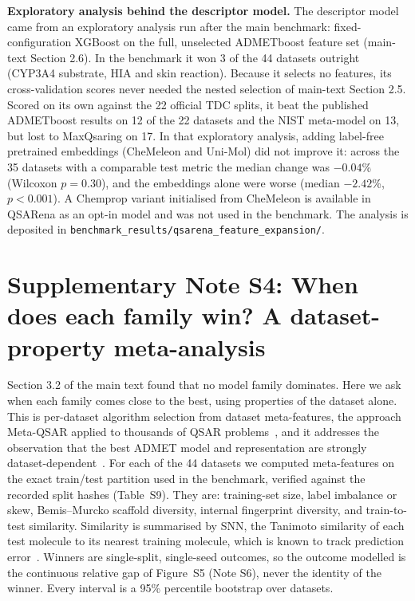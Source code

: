 \documentclass[11pt,a4paper]{article}
\begin{document}
\textbf{Exploratory analysis behind the descriptor model.} The descriptor model came from an exploratory analysis run after the main benchmark: fixed-configuration XGBoost on the full, unselected ADMETboost feature set (main-text Section 2.6). In the benchmark it won 3 of the 44 datasets outright (CYP3A4 substrate, HIA and skin reaction). Because it selects no features, its cross-validation scores never needed the nested selection of main-text Section 2.5. Scored on its own against the 22 official TDC splits, it beat the published ADMETboost results on 12 of the 22 datasets and the NIST meta-model on 13, but lost to MaxQsaring on 17. In that exploratory analysis, adding label-free pretrained embeddings (CheMeleon and Uni-Mol) did not improve it: across the 35 datasets with a comparable test metric the median change was $-0.04$\% (Wilcoxon $p = 0.30$), and the embeddings alone were worse (median $-2.42$\%, $p < 0.001$). A Chemprop variant initialised from CheMeleon is available in QSARena as an opt-in model and was not used in the benchmark. The analysis is deposited in \texttt{benchmark\_results/qsarena\_feature\_expansion/}.





\clearpage
\section*{Supplementary Note S4: When does each family win? A dataset-property meta-analysis}\label{note:meta}

Section 3.2 of the main text found that no model family dominates. Here we ask when each family comes close to the best, using properties of the dataset alone. This is per-dataset algorithm selection from dataset meta-features, the approach Meta-QSAR applied to thousands of QSAR problems~\cite{olier2018metaqsar}, and it addresses the observation that the best ADMET model and representation are strongly dataset-dependent~\cite{kamuntavicius2025benchmarking}. For each of the 44 datasets we computed meta-features on the exact train/test partition used in the benchmark, verified against the recorded split hashes (Table~S9). They are: training-set size, label imbalance or skew, Bemis--Murcko scaffold diversity, internal fingerprint diversity, and train-to-test similarity. Similarity is summarised by SNN, the Tanimoto similarity of each test molecule to its nearest training molecule, which is known to track prediction error~\cite{sheridan2004similarity}. Winners are single-split, single-seed outcomes, so the outcome modelled is the continuous relative gap of Figure~S5 (Note S6), never the identity of the winner. Every interval is a 95\% percentile bootstrap over datasets.
\end{document}

